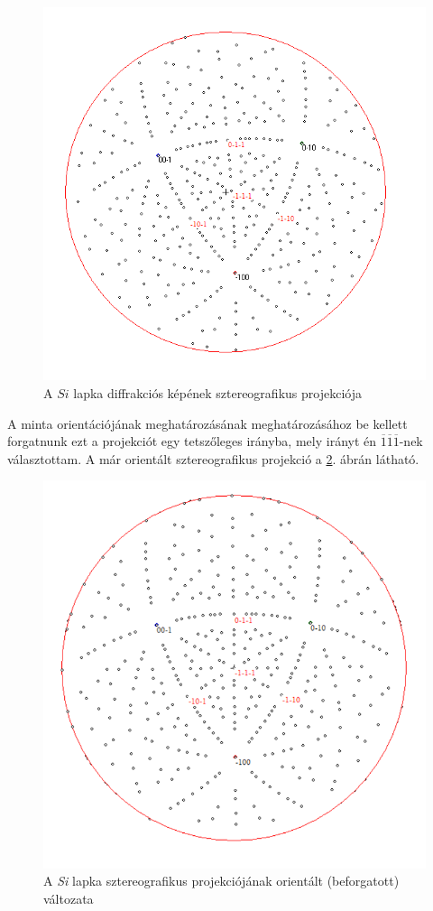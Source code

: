 \documentclass[12pt,a4paper]{article}
\begin{document}
\begin{figure}[!h]
\centering
\includegraphics[scale=1.8]{SI_sztereo_nonorient}
\caption{A $Si$ lapka diffrakciós képének sztereografikus projekciója}
\label{si:stereo}
\end{figure}
\newline
A minta orientációjának meghatározásának meghatározásához be kellett forgatnunk ezt a projekciót egy tetszőleges irányba, mely irányt én ${\overline{1}\overline{1}\overline{1}}$-nek választottam. A már orientált sztereografikus projekció a \ref{fig:si_orient}. ábrán látható.\\
\begin{figure}[!h]
\centering
\includegraphics[scale=1.6]{SI_sztereo_oriented}
\caption{A \emph{Si} lapka sztereografikus projekciójának orientált (beforgatott) változata}
\label{fig:si_orient}
\end{figure}
\end{document}
